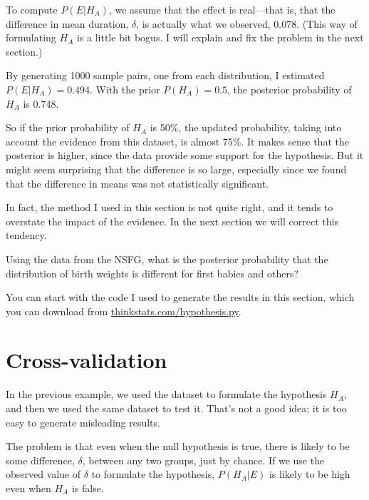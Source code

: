 \documentclass[12pt]{book}
\begin{document}

To compute $P(E | H_A)$, we assume that the effect is real---that is,
that the difference in mean duration, $\delta$, is actually what we
observed, $0.078$.  (This way of formulating $H_A$ is a little bit
bogus.  I will explain and fix the problem in the next section.)

By generating 1000 sample pairs, one from each
distribution, I estimated $P(E | H_A) = 0.494$.  With the prior
$P(H_A)=0.5$, the posterior probability of $H_A$ is 0.748.


So if the prior probability of $H_A$ is 50\%, the updated
probability, taking into account the evidence from this dataset,
is almost 75\%.  It makes sense that the posterior
is higher, since the data provide some support for the hypothesis.
But it might seem surprising that the difference is so large,
especially since we found that the difference in means was not
statistically significant.

In fact, the method I used in this section is not quite right, and
it tends to overstate the impact of the evidence.  In the next section
we will correct this tendency.

\begin{ex}

Using the data from the NSFG, what is the posterior probability that
the distribution of birth weights is different for first babies and
others?


You can start with the code I used to generate the results in this
section, which you can download from \url{thinkstats.com/hypothesis.py}.

\end{ex}


\section{Cross-validation}

In the previous example, we used the dataset to formulate the
hypothesis $H_A$, and then we used the same dataset to test it.
That's not a good idea; it is too easy to generate misleading results.

The problem is that even when the null hypothesis is true, there is
likely to be some difference, $\delta$, between any two groups, just
by chance.  If we use the observed value of $\delta$ to formulate
the hypothesis, $P(H_A | E)$ is likely to be high even when $H_A$ is
false.
\end{document}
